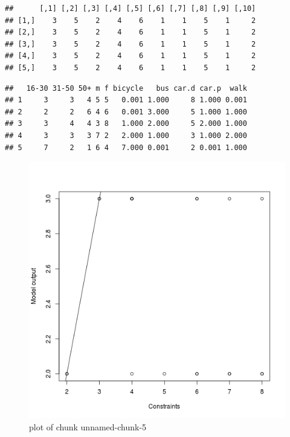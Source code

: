 \begin{verbatim}
##      [,1] [,2] [,3] [,4] [,5] [,6] [,7] [,8] [,9] [,10]
## [1,]    3    5    2    4    6    1    1    5    1     2
## [2,]    3    5    2    4    6    1    1    5    1     2
## [3,]    3    5    2    4    6    1    1    5    1     2
## [4,]    3    5    2    4    6    1    1    5    1     2
## [5,]    3    5    2    4    6    1    1    5    1     2
\end{verbatim}
\begin{Shaded}
\begin{Highlighting}[]
\end{Highlighting}
\end{Shaded}
\begin{verbatim}
##   16-30 31-50 50+ m f bicycle   bus car.d car.p  walk
## 1     3     3   4 5 5   0.001 1.000     8 1.000 0.001
## 2     2     2   6 4 6   0.001 3.000     5 1.000 1.000
## 3     3     4   4 3 8   1.000 2.000     5 2.000 1.000
## 4     3     3   3 7 2   2.000 1.000     3 1.000 2.000
## 5     7     2   1 6 4   7.000 0.001     2 0.001 1.000
\end{verbatim}
\begin{Shaded}
\begin{Highlighting}[]
\NormalTok{(}\NormalTok{(}\NormalTok{(} \NormalTok{, }
     \NormalTok{)}
\NormalTok{(} \NormalTok{, } \NormalTok{)}
\end{Highlighting}
\end{Shaded}
\begin{figure}[htbp]
\centering
\includegraphics{figure/unnamed-chunk-5.png}
\caption{plot of chunk unnamed-chunk-5}
\end{figure}

